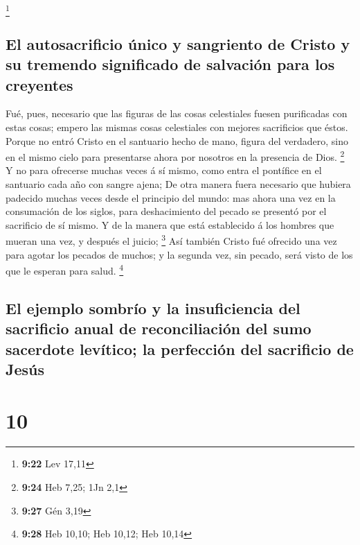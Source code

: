 \footnote{\textbf{9:22} Lev 17,11}

\hypertarget{el-autosacrificio-uxfanico-y-sangriento-de-cristo-y-su-tremendo-significado-de-salvaciuxf3n-para-los-creyentes}{%
\subsection{El autosacrificio único y sangriento de Cristo y su tremendo
significado de salvación para los
creyentes}\label{el-autosacrificio-uxfanico-y-sangriento-de-cristo-y-su-tremendo-significado-de-salvaciuxf3n-para-los-creyentes}}

 Fué, pues, necesario que las figuras de las cosas
celestiales fuesen purificadas con estas cosas; empero las mismas cosas
celestiales con mejores sacrificios que éstos.  Porque no
entró Cristo en el santuario hecho de mano, figura del verdadero, sino
en el mismo cielo para presentarse ahora por nosotros en la presencia de
Dios. \footnote{\textbf{9:24} Heb 7,25; 1Jn 2,1}  Y no
para ofrecerse muchas veces á sí mismo, como entra el pontífice en el
santuario cada año con sangre ajena;  De otra manera
fuera necesario que hubiera padecido muchas veces desde el principio del
mundo: mas ahora una vez en la consumación de los siglos, para
deshacimiento del pecado se presentó por el sacrificio de sí mismo.
 Y de la manera que está establecido á los hombres que
mueran una vez, y después el juicio; \footnote{\textbf{9:27} Gén 3,19}
 Así también Cristo fué ofrecido una vez para agotar los
pecados de muchos; y la segunda vez, sin pecado, será visto de los que
le esperan para salud. \footnote{\textbf{9:28} Heb 10,10; Heb 10,12; Heb
  10,14}

\hypertarget{el-ejemplo-sombruxedo-y-la-insuficiencia-del-sacrificio-anual-de-reconciliaciuxf3n-del-sumo-sacerdote-levuxedtico-la-perfecciuxf3n-del-sacrificio-de-jesuxfas}{%
\subsection{El ejemplo sombrío y la insuficiencia del sacrificio anual
de reconciliación del sumo sacerdote levítico; la perfección del
sacrificio de
Jesús}\label{el-ejemplo-sombruxedo-y-la-insuficiencia-del-sacrificio-anual-de-reconciliaciuxf3n-del-sumo-sacerdote-levuxedtico-la-perfecciuxf3n-del-sacrificio-de-jesuxfas}}

\hypertarget{section-9}{%
\section{10}\label{section-9}}


